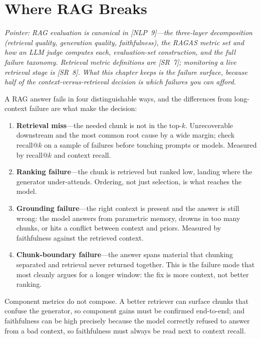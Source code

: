 \section{Where RAG Breaks}
\label{sec:rag_eval}

\textit{Pointer: RAG evaluation is canonical in [NLP~9]---the three-layer decomposition (retrieval quality, generation quality, faithfulness), the RAGAS metric set and how an LLM judge computes each, evaluation-set construction, and the full failure taxonomy. Retrieval metric definitions are [SR~7]; monitoring a live retrieval stage is [SR~8]. What this chapter keeps is the failure \emph{surface}, because half of the context-versus-retrieval decision is which failures you can afford.}

A RAG answer fails in four distinguishable ways, and the differences from long-context failure are what make the decision:

\begin{enumerate}
    \item \textbf{Retrieval miss}---the needed chunk is not in the top-$k$. Unrecoverable downstream and the most common root cause by a wide margin; check recall@$k$ on a sample of failures before touching prompts or models. Measured by recall@$k$ and context recall.
    \item \textbf{Ranking failure}---the chunk is retrieved but ranked low, landing where the generator under-attends. Ordering, not just selection, is what reaches the model.
    \item \textbf{Grounding failure}---the right context is present and the answer is still wrong: the model answers from parametric memory, drowns in too many chunks, or hits a conflict between context and priors. Measured by faithfulness against the retrieved context.
    \item \textbf{Chunk-boundary failure}---the answer spans material that chunking separated and retrieval never returned together. This is the failure mode that most cleanly argues for a longer window: the fix is more context, not better ranking.
\end{enumerate}

Component metrics do not compose. A better retriever can surface chunks that confuse the generator, so component gains must be confirmed end-to-end; and faithfulness can be high precisely because the model correctly refused to answer from a bad context, so faithfulness must always be read next to context recall.

